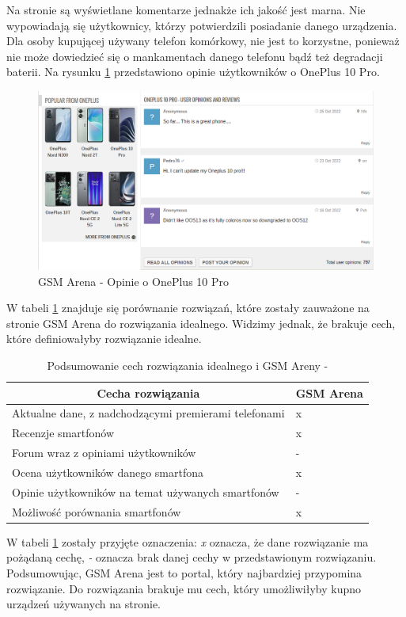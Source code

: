 Na stronie są wyświetlane komentarze jednakże ich jakość jest marna. Nie wypowiadają się użytkownicy, którzy potwierdzili posiadanie danego urządzenia. Dla osoby kupującej używany telefon komórkowy, nie jest to korzystne, ponieważ nie może dowiedzieć się o mankamentach danego telefonu bądź też degradacji baterii. Na rysunku \ref{GSM_Arena_5} przedstawiono opinie użytkowników o OnePlus 10 Pro.
\begin{figure}[H]
    \centering
    \includegraphics[scale=0.52]{img/GSM Arena/Comments.png}
    \caption{GSM Arena - Opinie o OnePlus 10 Pro}
    \label{GSM_Arena_5}
\end{figure}

W tabeli \ref{comparison_gsm_arena} znajduje się porównanie rozwiązań, które zostały zauważone na stronie GSM Arena do rozwiązania idealnego. Widzimy jednak, że brakuje cech, które definiowałyby rozwiązanie idealne.
\begin{table}[H]
    \centering
        \begin{tabular}{|l|l|}
        \hline
        \multicolumn{1}{|c|}{Cecha rozwiązania}    & \multicolumn{1}{c|}{GSM Arena} \\ \hline
        Aktualne dane, z nadchodzącymi premierami telefonami & x                             \\ \hline
        Recenzje smartfonów                                  & x                                \\ \hline
        Forum wraz z opiniami użytkowników                   & -                                \\ \hline
        Ocena użytkowników danego smartfona                  & x                             \\ \hline
        Opinie użytkowników na temat używanych smartfonów    & -                                 \\ \hline
        Możliwość porównania smartfonów                      & x                                \\ \hline
        \end{tabular}
    \caption{Podsumowanie cech rozwiązania idealnego i GSM Areny -}
\label{comparison_gsm_arena}
\end{table}
W tabeli \ref{comparison_gsm_arena} zostały przyjęte oznaczenia: \textit{x} oznacza, że dane rozwiązanie ma pożądaną cechę, \textit{-} oznacza brak danej cechy w przedstawionym rozwiązaniu.
Podsumowując, GSM Arena jest to portal, który najbardziej przypomina rozwiązanie. Do rozwiązania brakuje mu cech, który umożliwiłyby kupno urządzeń używanych na stronie.

